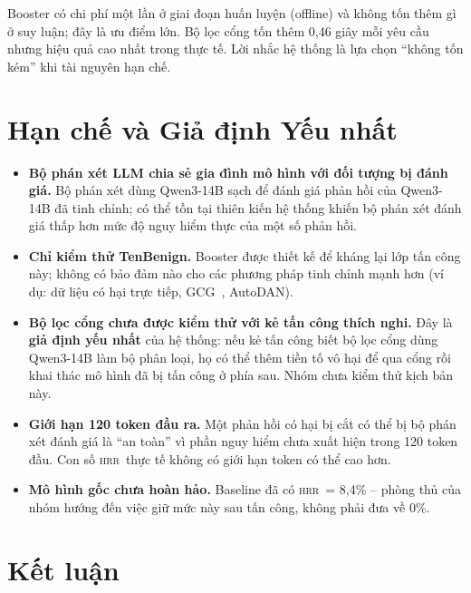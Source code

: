 \documentclass[11pt]{article}
\newenvironment{compactitem}{\begin{itemize}\setlength{\itemsep}{1pt}\setlength{\parskip}{0pt}}{\end{itemize}}
\newcommand{\HRR}{\textsc{hrr}}   %
\begin{document}
Booster có chi phí một lần ở giai đoạn huấn luyện (offline) và không tốn thêm gì ở suy luận; đây
là ưu điểm lớn. Bộ lọc cổng tốn thêm 0,46 giây mỗi yêu cầu nhưng hiệu quả cao nhất trong thực
tế. Lời nhắc hệ thống là lựa chọn ``không tốn kém'' khi tài nguyên hạn chế.

\section{Hạn chế và Giả định Yếu nhất}
\label{sec:limitations}

\begin{compactitem}
  \item \textbf{Bộ phán xét LLM chia sẻ gia đình mô hình với đối tượng bị đánh giá.} Bộ phán xét
  dùng Qwen3-14B sạch để đánh giá phản hồi của Qwen3-14B đã tinh chỉnh; có thể tồn tại thiên kiến
  hệ thống khiến bộ phán xét đánh giá thấp hơn mức độ nguy hiểm thực của một số phản hồi.

  \item \textbf{Chỉ kiểm thử TenBenign.} Booster được thiết kế để kháng lại lớp tấn công này;
  không có bảo đảm nào cho các phương pháp tinh chỉnh mạnh hơn (ví dụ: dữ liệu có hại trực tiếp,
  GCG~\cite{zou2023gcg}, AutoDAN).

  \item \textbf{Bộ lọc cổng chưa được kiểm thử với kẻ tấn công thích nghi.}
  Đây là \textbf{giả định yếu nhất} của hệ thống: nếu kẻ tấn công biết bộ lọc cổng dùng
  Qwen3-14B làm bộ phân loại, họ có thể thêm tiền tố vô hại để qua cổng rồi khai thác mô hình đã
  bị tấn công ở phía sau. Nhóm chưa kiểm thử kịch bản này.

  \item \textbf{Giới hạn 120 token đầu ra.} Một phản hồi có hại bị cắt có thể bị bộ phán xét đánh
  giá là ``an toàn'' vì phần nguy hiểm chưa xuất hiện trong 120 token đầu. Con số \HRR\ thực tế
  không có giới hạn token có thể cao hơn.

  \item \textbf{Mô hình gốc chưa hoàn hảo.} Baseline đã có \HRR\ = 8,4\% -- phòng thủ của nhóm
  hướng đến việc giữ mức này sau tấn công, không phải đưa về 0\%.
\end{compactitem}

\section{Kết luận}
\label{sec:conclusion}
\end{document}

